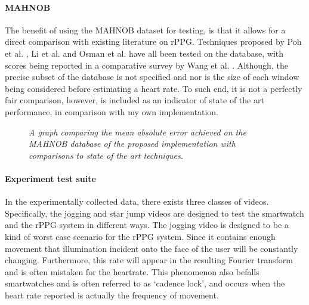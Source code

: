 \paragraph{MAHNOB}
The benefit of using the MAHNOB dataset for testing, is that it allows for a direct comparison with existing literature on rPPG.
Techniques proposed by Poh et al. \cite{poh}, Li et al. \cite{li} and Osman et al. \cite{osman} have all been tested on the database, with 
scores being reported in a comparative survey by Wang et al. \cite{comparative}.
Although, the precise subset of the database is not specified and nor is the size of each window being considered before estimating a heart rate.
To such end, it is not a perfectly fair comparison, however, is included as an indicator of state of the art performance, in comparison with my own implementation.

\begin{figure}
    \centering
    \scalebox{0.6}{}
   \caption{\textit{A graph comparing the mean absolute error achieved on the MAHNOB database of the proposed implementation with comparisons to state of the art techniques.}}
\end{figure}
\paragraph{Experiment test suite}
In the experimentally collected data, there exists three classes of videos. Specifically, the jogging and star jump videos are designed to test the smartwatch and 
the rPPG system in different ways. The jogging video is designed to be a kind of worst case scenario for the rPPG system. Since it contains enough movement that
illumination incident onto the face of the user will be constantly changing. Furthermore, this rate will appear in the resulting Fourier transform and is often mistaken
for the heartrate. This phenomenon also befalls smartwatches and is often referred to as `cadence lock', and occurs when the heart rate reported is actually the frequency 
of movement.

